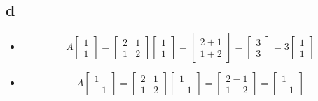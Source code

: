 \documentclass[10pt]{article}
\begin{document}
\subsection*{d}
\begin{itemize}
    \item 
    \begin{equation*}
        A
        \begin{bmatrix}
            1 \\
            1
        \end{bmatrix}
        =
        \begin{bmatrix}
            2 & 1 \\
            1 & 2
        \end{bmatrix}
        \begin{bmatrix}
            1 \\
            1
        \end{bmatrix}
        =
        \begin{bmatrix}
            2 + 1 \\
            1 + 2
        \end{bmatrix}
        =
        \begin{bmatrix}
            3 \\
            3
        \end{bmatrix}
        = 3
        \begin{bmatrix}
            1 \\
            1
        \end{bmatrix}
    \end{equation*}
    \item
        \begin{equation*}
        A
        \begin{bmatrix}
            1 \\
            -1
        \end{bmatrix}
        =
        \begin{bmatrix}
            2 & 1 \\
            1 & 2
        \end{bmatrix}
        \begin{bmatrix}
            1 \\
            -1
        \end{bmatrix}
        =
        \begin{bmatrix}
            2-1 \\
            1-2
        \end{bmatrix}
        =
        \begin{bmatrix}
            1 \\
            -1
        \end{bmatrix}
    \end{equation*}
\end{itemize}
\end{document}
